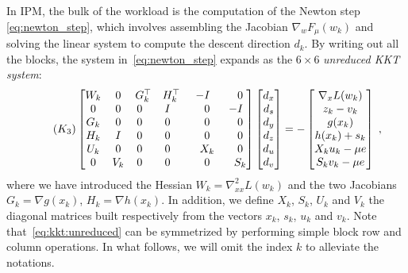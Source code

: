 In IPM, the bulk of the workload is the computation of the Newton
step \eqref{eq:newton_step}, which involves assembling the Jacobian
$\nabla_w F_\mu(w_k)$ and solving the linear system to compute
the descent direction $d_k$.
By writing out all the blocks, the system in~\eqref{eq:newton_step} expands as the $6 \times 6$
\emph{unreduced KKT system}:
\begin{equation}
  \label{eq:kkt:unreduced}
  \setlength\arraycolsep{5pt}
  \tag{$K_3$}
  \begin{bmatrix}
    W_k & 0 & G_k^\top           & H_k^\top           & -I           & \phantom{-}0 \\
    0 & 0 & 0\phantom{^\top} & I\phantom{^\top} & \phantom{-}0 & -I           \\
    G_k & 0 & 0\phantom{^\top} & 0\phantom{^\top} & \phantom{-}0 & \phantom{-}0 \\
    H_k & I & 0\phantom{^\top} & 0\phantom{^\top} & \phantom{-}0 & \phantom{-}0 \\
    U_k & 0 & 0\phantom{^\top} & 0\phantom{^\top} & \phantom{-}X_k & \phantom{-}0 \\
    0 & V_k & 0\phantom{^\top} & 0\phantom{^\top} & \phantom{-}0 & \phantom{-}S_k
  \end{bmatrix}
  \begin{bmatrix}
    d_x \\
    d_s \\
    d_y \\
    d_z \\
    d_u \\
    d_v
  \end{bmatrix}
  = - \begin{bmatrix}
    \nabla_x L(w_k) \\
       z_k - v_k  \\
       g(x_k)  \\
       h(x_k) + s_k  \\
       X_k u_k - \mu e  \\
       S_k v_k - \mu e
  \end{bmatrix} \; ,
\end{equation}
where we have introduced the Hessian $W_k = \nabla^2_{x x} L(w_k)$ and
the two Jacobians $G_k = \nabla g(x_k)$, $H_k = \nabla h(x_k)$.
In addition, we define $X_k$, $S_k$, $U_k$ and $V_k$ the diagonal matrices built respectively
from the vectors $x_k$, $s_k$, $u_k$ and $v_k$.
Note that~\eqref{eq:kkt:unreduced} can be symmetrized by performing simple block row and column operations.
In what follows, we will omit the index $k$ to alleviate the notations.


